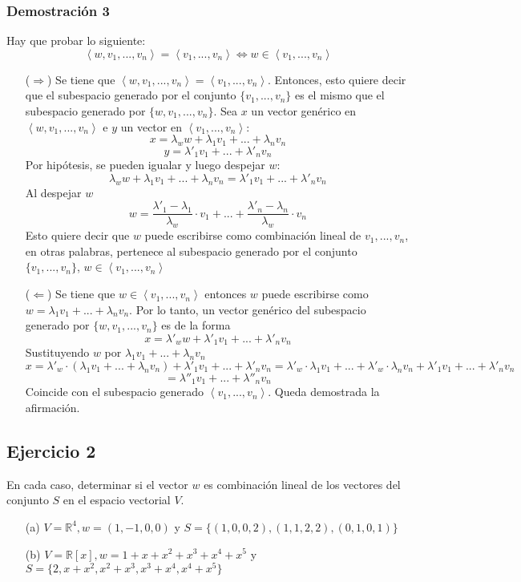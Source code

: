 \documentclass[a4paper,12pt]{article}
\begin{document}
\subsubsection{Demostración 3}
Hay que probar lo siguiente:
$$
\left \langle w,v_1,...,v_n \right \rangle = \left \langle v_1,...,v_n \right \rangle \Leftrightarrow w\in \left \langle v_1,...,v_n \right \rangle
$$
\begin{itemize}
    \item[($\Rightarrow$)] Se tiene que $\left \langle w,v_1,...,v_n \right \rangle = \left \langle v_1,...,v_n \right \rangle$. Entonces, esto quiere decir que el subespacio generado por el conjunto $\{ v_1,...,v_n \}$ es el mismo que el subespacio generado por $\{ w,v_1,...,v_n \}$. \newline
    Sea $x$ un vector genérico en $\left \langle w,v_1,...,v_n \right \rangle$ e $y$ un vector en $\left \langle v_1,...,v_n \right \rangle$:
    $$
    x = \lambda_ww+\lambda_1v_1+...+\lambda_nv_n
    $$
    $$
    y = \lambda'_1v_1+...+\lambda'_nv_n
    $$
    Por hipótesis, se pueden igualar y luego despejar $w$:
    $$
    \lambda_ww+\lambda_1v_1+...+\lambda_nv_n = \lambda'_1v_1+...+\lambda'_nv_n
    $$
    Al despejar $w$
    $$
    w = \frac{\lambda'_1-\lambda_1}{\lambda_w}\cdot v_1 + ... + \frac{\lambda'_n-\lambda_n}{\lambda_w}\cdot v_n
    $$
    Esto quiere decir que $w$ puede escribirse como combinación lineal de $v_1,...,v_n$, en otras palabras, pertenece al subespacio generado por el conjunto $\{ v_1,...,v_n \}$, \textbf{$w\in \left \langle v_1,...,v_n \right \rangle$}
    \item[($\Leftarrow$)] Se tiene que $w \in \left \langle v_1,...,v_n \right \rangle$ entonces $w$ puede escribirse como $w=\lambda_1v_1+...+\lambda_nv_n$.
    \newline Por lo tanto, un vector genérico del subespacio generado por $\{ w,v_1,...,v_n \}$ es de la forma
    $$
    x = \lambda'_ww+\lambda'_1v_1+...+\lambda'_nv_n
    $$
    Sustituyendo $w$ por $\lambda_1v_1+...+\lambda_nv_n$
    $$
    x = \lambda'_w\cdot (\lambda_1v_1+...+\lambda_nv_n) + \lambda'_1v_1+...+\lambda'_nv_n = \lambda'_w\cdot\lambda_1v_1 + ... + \lambda'_w\cdot\lambda_nv_n+ \lambda'_1v_1+...+\lambda'_nv_n
    $$
    $$
    = \lambda''_1v_1+...+\lambda''_nv_n
    $$
    Coincide con el subespacio generado $\left \langle v_1,...,v_n \right \rangle$. Queda demostrada la afirmación.
\end{itemize}
\subsection{Ejercicio 2}
En cada caso, determinar si el vector $w$ es combinación lineal de los vectores del conjunto $S$ en el espacio vectorial $V$.
\begin{itemize}
    \item[(a)] $V = \mathds{R}^4, w=(1,-1,0,0)$ y $S=\{ (1,0,0,2), (1,1,2,2), (0,1,0,1)\}$
    \item[(b)] $V = \mathds{R}[x], w=1+x+x^2+x^3+x^4+x^5$ y $S=\{2,x+x^2,x^2+x^3,x^3+x^4,x^4+x^5 \}$
\end{itemize}
\end{document}
